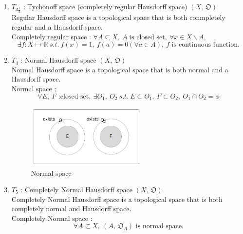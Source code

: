 \documentclass[english,dvipdfmx]{jsarticle}
\begin{document}
\begin{description}
\begin{enumerate}
            \item $T_{3 \frac{1}{2}}$ : Tychonoff space (completely regular Hausdorff space) $(X,\ \mathfrak{O})$ \\
                Regular Hausdorff space is a topological space that is both conmpletely regular and a Hausdorff space. \\
                Completely regular space : $\forall A \subseteq X,\ A \text{ is closed set},\ \forall x \in X \backslash A,$\\
                $$ \exists f : X \mapsto \mathbb{R} \ s.t. \ f(x) = 1,\ f(a) = 0 (\forall a \in A),\ f \text{ is continuous function.}$$
            
            \item $T_{4}$ : Normal Hausdorff space $(X,\ \mathfrak{O})$ \\
                Normal Hausdorff space is a topological space that is both normal and a Hausdorff space. \\
                Normal space : $$\forall E,\ F \text{ :closed set},\ \exists O_1,\ O_2 \ s.t. \ E \subset O_1,\ F \subset O_2,\ O_1 \cap O_2 = \phi$$
                \begin{figure}[H]
                    \begin{center}
                        \includegraphics[clip,width=6cm]{./T4.png}
                        \caption{Normal space}
                    \end{center}
                \end{figure}
            \item $T_5$ : Completely Normal Hausdorff space $(X,\ \mathfrak{O})$ \\
                Completely Normal Hausdorff space is a topological space that is both completely normal and Hausdorff space. \\
                Completely Normal space : $$\forall A \subset X,\ ( A,\ \mathfrak{O}_{A}) \text{ is normal space.} $$
            


\end{enumerate}
\end{description}
\end{document}
